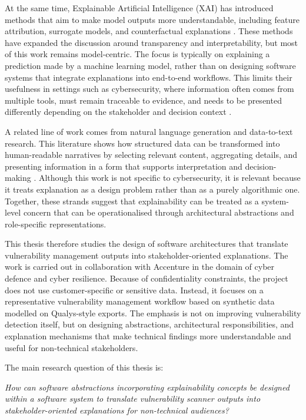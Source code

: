At the same time, Explainable Artificial Intelligence (XAI) has introduced methods that aim to make model outputs more understandable, including feature attribution, surrogate models, and counterfactual explanations \cite{doshivelez2017rigorous, guidotti2018survey, barredo2020xai}. These methods have expanded the discussion around transparency and interpretability, but most of this work remains model-centric. The focus is typically on explaining a prediction made by a machine learning model, rather than on designing software systems that integrate explanations into end-to-end workflows. This limits their usefulness in settings such as cybersecurity, where information often comes from multiple tools, must remain traceable to evidence, and needs to be presented differently depending on the stakeholder and decision context \cite{lipton2018mythos, miller2019explanation}.

A related line of work comes from natural language generation and data-to-text research. This literature shows how structured data can be transformed into human-readable narratives by selecting relevant content, aggregating details, and presenting information in a form that supports interpretation and decision-making \cite{gatt2018survey, reiter2000nlg}. Although this work is not specific to cybersecurity, it is relevant because it treats explanation as a design problem rather than as a purely algorithmic one. Together, these strands suggest that explainability can be treated as a system-level concern that can be operationalised through architectural abstractions and role-specific representations.

This thesis therefore studies the design of software architectures that translate vulnerability management outputs into stakeholder-oriented explanations. The work is carried out in collaboration with Accenture in the domain of cyber defence and cyber resilience. Because of confidentiality constraints, the project does not use customer-specific or sensitive data. Instead, it focuses on a representative vulnerability management workflow based on synthetic data modelled on Qualys-style exports. The emphasis is not on improving vulnerability detection itself, but on designing abstractions, architectural responsibilities, and explanation mechanisms that make technical findings more understandable and useful for non-technical stakeholders.

The main research question of this thesis is:

\textit{How can software abstractions incorporating explainability concepts be designed within a software system to translate vulnerability scanner outputs into stakeholder-oriented explanations for non-technical audiences?}

